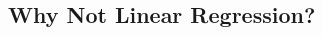 \documentclass[12pt]{article}
\begin{document}
\begin{multicols}{2}
% 
% 
% 
%   
% 
% 


\section*{Why Not Linear Regression?}


\end{multicols}
\end{document}
